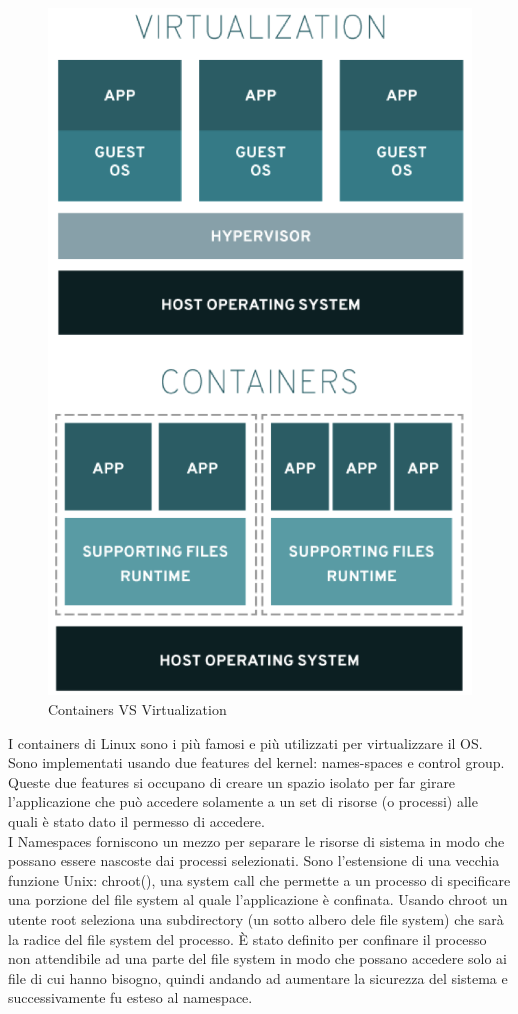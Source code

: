\documentclass{article}
\begin{document}
\begin{figure}[H]
\centering
\includegraphics[scale=0.5]{img/Virt_tech/21.png}
\caption{Containers VS Virtualization}
\end{figure}
I containers di Linux sono i più famosi e più utilizzati per virtualizzare il OS. Sono implementati usando due features del kernel: names-spaces e control group. Queste due features si occupano di creare un spazio isolato per far girare l'applicazione che può accedere solamente a un set di risorse (o processi) alle quali è stato dato il permesso di accedere.\\
I Namespaces forniscono un mezzo per separare le risorse di sistema in modo che possano essere nascoste dai processi selezionati. Sono l'estensione di una vecchia funzione Unix: chroot(), una system call che permette a un processo di specificare una porzione del file system al quale l'applicazione è confinata. Usando chroot un utente root seleziona una subdirectory (un sotto albero dele file system) che sarà la radice del file system del processo. È stato definito per confinare il processo non attendibile ad una parte del file system in modo che possano accedere solo ai file di cui hanno bisogno, quindi andando ad aumentare la sicurezza del sistema e successivamente fu esteso al namespace. 
\end{document}
